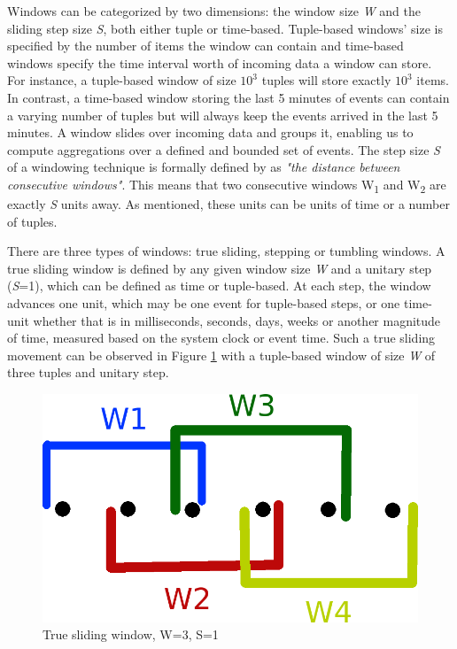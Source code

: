 Windows can be categorized by two dimensions: the window size \textit{W} and the sliding step size \textit{S}, both either tuple or time-based. Tuple-based windows' size is specified by the number of items the window can contain and time-based windows specify the time interval worth of incoming data a window can store. For instance, a tuple-based window of size $10^3$ tuples will store exactly $10^3$ items. In contrast, a time-based window storing the last 5 minutes of events can contain a varying number of tuples but will always keep the events arrived in the last 5 minutes. A window slides over incoming data and groups it, enabling us to compute aggregations over a defined and bounded set of events. The step size \textit{S} of a windowing technique is formally defined by \cite{Botan-SECRET} as \textit{"the distance between consecutive windows"}. This means that two consecutive windows W\textsubscript{1} and W\textsubscript{2} are exactly \textit{S} units away. As mentioned, these units can be units of time or a number of tuples.

There are three types of windows: true sliding, stepping or tumbling windows.
A true sliding window is defined by any given window size \textit{W} and a unitary step (\textit{S}=1), which can be defined as time or tuple-based. At each step, the window advances one unit, which may be one event for tuple-based steps, or one time-unit whether that is in milliseconds, seconds, days, weeks or another magnitude of time, measured based on the system clock or event time. Such a true sliding movement can be observed in Figure \ref{fig:sliding-window} with a tuple-based window of size \textit{W} of three tuples and unitary step. 

\begin{figure}[!htb]
    \begin{center}
      \includegraphics[scale=0.3]{figures/sliding.png}
      \caption[True sliding window]{True sliding window, W=3, S=1}
      \label{fig:sliding-window}
    \end{center}
\end{figure}

